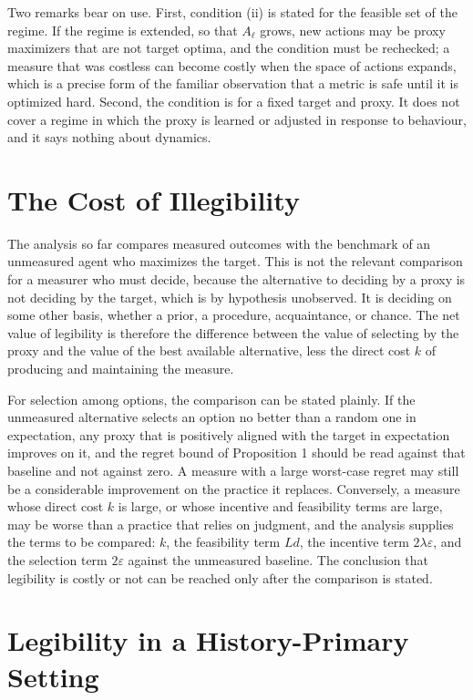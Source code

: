 \documentclass[11pt]{article}
\theoremstyle{remark}
\begin{document}
Two remarks bear on use. First, condition (ii) is stated for the feasible set of the regime. If the regime is extended, so that $A_\ell$ grows, new actions may be proxy maximizers that are not target optima, and the condition must be rechecked; a measure that was costless can become costly when the space of actions expands, which is a precise form of the familiar observation that a metric is safe until it is optimized hard. Second, the condition is for a fixed target and proxy. It does not cover a regime in which the proxy is learned or adjusted in response to behaviour, and it says nothing about dynamics.

\section{The Cost of Illegibility}

The analysis so far compares measured outcomes with the benchmark of an unmeasured agent who maximizes the target. This is not the relevant comparison for a measurer who must decide, because the alternative to deciding by a proxy is not deciding by the target, which is by hypothesis unobserved. It is deciding on some other basis, whether a prior, a procedure, acquaintance, or chance. The net value of legibility is therefore the difference between the value of selecting by the proxy and the value of the best available alternative, less the direct cost $k$ of producing and maintaining the measure.

For selection among options, the comparison can be stated plainly. If the unmeasured alternative selects an option no better than a random one in expectation, any proxy that is positively aligned with the target in expectation improves on it, and the regret bound of Proposition 1 should be read against that baseline and not against zero. A measure with a large worst-case regret may still be a considerable improvement on the practice it replaces. Conversely, a measure whose direct cost $k$ is large, or whose incentive and feasibility terms are large, may be worse than a practice that relies on judgment, and the analysis supplies the terms to be compared: $k$, the feasibility term $Ld$, the incentive term $2\lambda\varepsilon$, and the selection term $2\varepsilon$ against the unmeasured baseline. The conclusion that legibility is costly or not can be reached only after the comparison is stated.

\section{Legibility in a History-Primary Setting}
\end{document}
